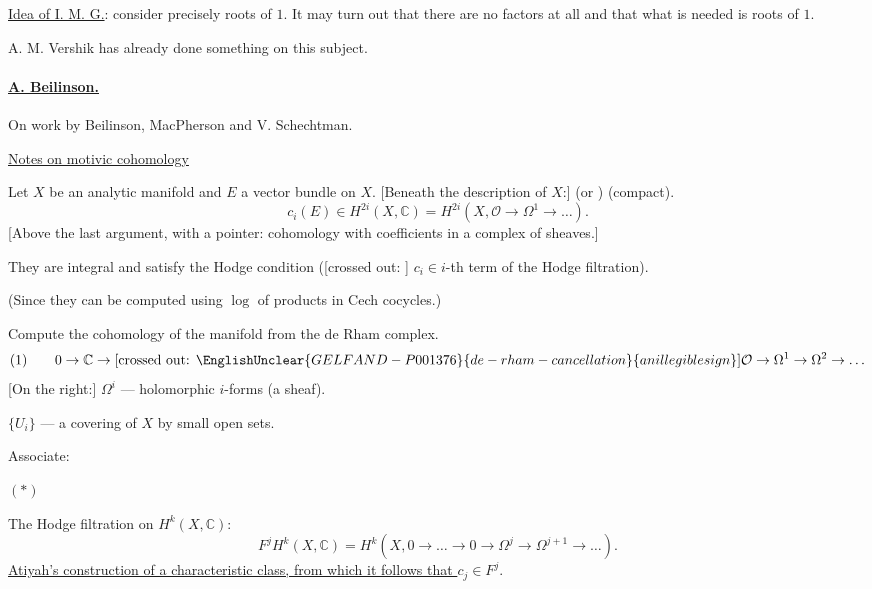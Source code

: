 \underline{Idea of I. M. G.}: consider precisely roots of $1$.
It may turn out that there are no factors at all and that what is needed is roots of $1$.

A. M. Vershik has already done something on this subject.

\paragraph*{\underline{A. Beilinson.}}
On work by Beilinson, MacPherson and V. Schechtman.

\underline{Notes on motivic cohomology}

Let $X$ be an analytic manifold and $E$ a vector bundle on $X$.
[Beneath the description of $X$:] (or )
(compact).
\begin{equation*}
c_i(E)\in H^{2i}(X,\mathbb C)
=H^{2i}(X,\mathcal O\to\Omega^1\to\ldots).
\end{equation*}
[Above the last argument, with a pointer: cohomology with coefficients in a complex of sheaves.]

They are integral and satisfy the Hodge condition
([crossed out: ]
$c_i\in i$-th term of the Hodge filtration).

(Since they can be computed using $\log$ of products in Cech cocycles.)

Compute the cohomology of the manifold from the de Rham complex.
\begin{equation*}
(1)\qquad 0\to\mathbb C\to
\text{[crossed out: }\EnglishUnclear{GELFAND-P001376}{de-rham-cancellation}{an illegible sign}\text{]}
\mathcal O\to\Omega^1\to\Omega^2\to\ldots
\end{equation*}
[On the right:] $\Omega^i$ --- holomorphic $i$-forms (a sheaf).

$\{U_i\}$ --- a covering of $X$ by small open sets.

Associate:
\begin{center}
$(*)\quad$
\end{center}

The Hodge filtration on $H^k(X,\mathbb C)$:
\begin{equation*}
F^j H^k(X,\mathbb C)
=H^k(X,0\to\ldots\to0\to\Omega^j\to\Omega^{j+1}\to\ldots).
\end{equation*}
\underline{Atiyah's construction of a characteristic class, from which it follows that $c_j\in F^j$}.

